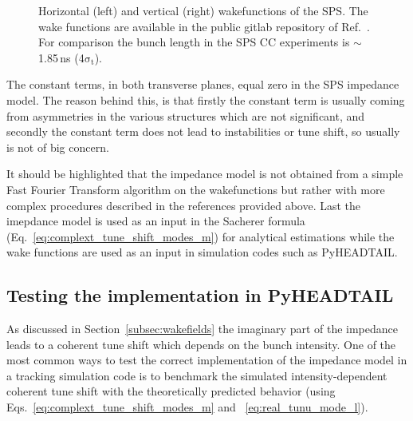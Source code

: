 \begin{figure}[!ht]
\begin{subfigure}[t]{0.45\textwidth}
    \end{subfigure}
    \hfill
     \caption{Horizontal (left) and vertical (right) wakefunctions of the SPS. The wake functions are available in the public gitlab repository of Ref.~\cite{sps_impedance_model_git}. For comparison the bunch length in the SPS CC experiments is $\sim$ 1.85\,ns (4$\mathrm{\sigma_t}$).} %
     \label{fig:sps_wakefunctions_model_H_V}
 \end{figure}

 The constant terms, in both transverse planes, equal zero in the SPS impedance model. The reason behind this, is that firstly the constant term is usually coming from asymmetries in the various structures which are not significant, and secondly the constant term does not lead to instabilities or tune shift, so usually is not of big concern.

It should be highlighted that the impedance model is not obtained from a simple Fast Fourier Transform algorithm on the wakefunctions but rather with more complex procedures described in the references provided above. Last the imepdance model is used as an input in the Sacherer formula (Eq.~\eqref{eq:complext_tune_shift_modes_m}) for analytical estimations while the wake functions are used as an input in simulation codes such as PyHEADTAIL.




\subsection{Testing the implementation in PyHEADTAIL}\label{subsec:test_implementation_pyheatail}
As discussed in Section~\ref{subsec:wakefields} the imaginary part of the impedance leads to a coherent tune shift which depends on the bunch intensity. One of the most common ways to test the correct implementation of the impedance model in a tracking simulation code is to benchmark the simulated intensity-dependent coherent tune shift with the theoretically predicted behavior (using Eqs.~\eqref{eq:complext_tune_shift_modes_m} and ~\eqref{eq:real_tunu_mode_l}).

